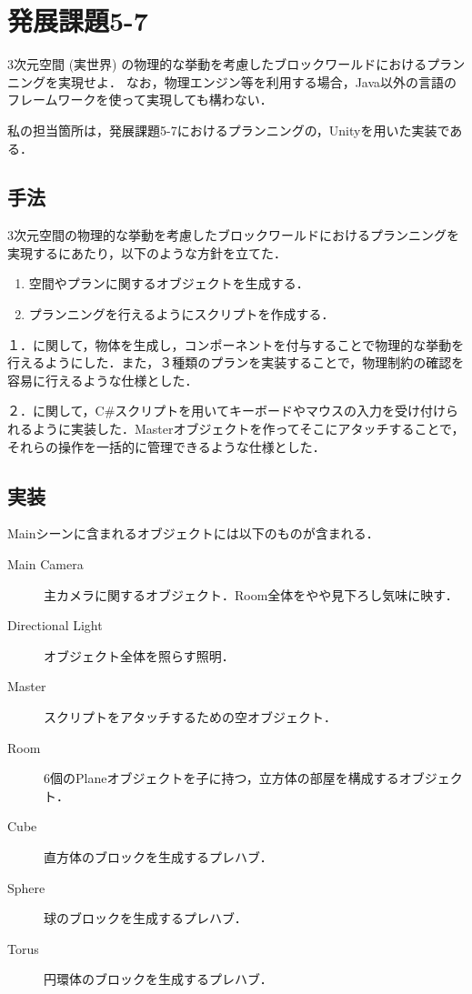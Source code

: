 \documentclass[12pt]{jarticle}
\begin{document}
\section{発展課題5-7}
\begin{screen}
3次元空間 (実世界) の物理的な挙動を考慮したブロックワールドにおけるプランニングを実現せよ．
なお，物理エンジン等を利用する場合，Java以外の言語のフレームワークを使って実現しても構わない．
\end{screen}
私の担当箇所は，発展課題5-7におけるプランニングの，Unityを用いた実装である．

\subsection{手法}
3次元空間の物理的な挙動を考慮したブロックワールドにおけるプランニングを実現するにあたり，以下のような方針を立てた．
\begin{enumerate}
\item 空間やプランに関するオブジェクトを生成する．
\item プランニングを行えるようにスクリプトを作成する．
\end{enumerate}

１．に関して，物体を生成し，コンポーネントを付与することで物理的な挙動を行えるようにした．また，３種類のプランを実装することで，物理制約の確認を容易に行えるような仕様とした．

２．に関して，C\#スクリプトを用いてキーボードやマウスの入力を受け付けられるように実装した．Masterオブジェクトを作ってそこにアタッチすることで，それらの操作を一括的に管理できるような仕様とした．

\subsection{実装}
Mainシーンに含まれるオブジェクトには以下のものが含まれる．
\begin{description}
\item[Main Camera] 主カメラに関するオブジェクト．Room全体をやや見下ろし気味に映す．
\item[Directional Light] オブジェクト全体を照らす照明．
\item[Master] スクリプトをアタッチするための空オブジェクト．
\item[Room] 6個のPlaneオブジェクトを子に持つ，立方体の部屋を構成するオブジェクト．
\item[Cube] 直方体のブロックを生成するプレハブ．
\item[Sphere] 球のブロックを生成するプレハブ．
\item[Torus] 円環体のブロックを生成するプレハブ．
\end{description} 
\end{document}
